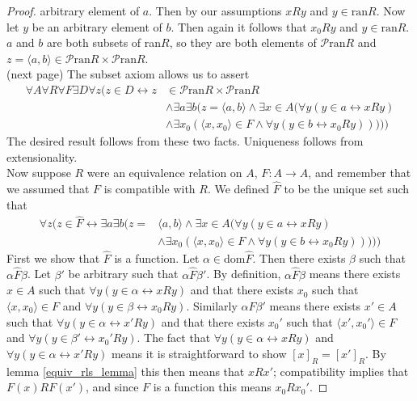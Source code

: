 \documentclass{report}
\begin{document}
\begin{proof}
arbitrary element of $a$. Then by our assumptions $xRy$ and $y\in\text{ran}R$. Now let $y$ be an arbitrary element of $b$. Then again it follows that $x_0Ry$ and
$y\in\text{ran}R$. $a$ and $b$ are both subsets of ran$R$, so they are both elements of $\mathscr P\text{ran}R$ and $z=\langle a,b\rangle\in\mathscr P\text{ran}R\times\mathscr P\text{ran}R$.\\
(next page)\newpage
The subset axiom allows us to assert
\begin{align*}
\forall A\forall R\forall F\exists D\forall z(z\in D\leftrightarrow z&\in\mathscr P\text{ran}R\times\mathscr P\text{ran}R\\
&\land\exists a\exists b(z=\langle a,b\rangle\land\exists x\in A(\forall y(y\in a\leftrightarrow xRy)\\
&\land\exists x_0(\langle x,x_0\rangle\in F\land\forall y(y\in b\leftrightarrow x_0Ry)))))
\end{align*}
The desired result follows from these two facts. Uniqueness follows from extensionality.\\
\indent Now suppose $R$ were an equivalence relation on $A$, $F:A\to A$, and remember that we assumed that $F$ is compatible with $R$. We defined $\hat F$ to be the unique set such that
\begin{align*}
\forall z(z\in\hat F\leftrightarrow\exists a\exists b(z=&\langle a,b\rangle\land\exists x\in A(\forall y(y\in a\leftrightarrow xRy)\\
&\land\exists x_0(\langle x,x_0\rangle\in F\land\forall y(y\in b\leftrightarrow x_0Ry)))))
\end{align*}
First we show that $\hat F$ is a function. Let $\alpha\in\text{dom}\hat F$. Then there exists $\beta$ such that $\alpha\hat F\beta$. Let $\beta'$ be arbitrary such that $\alpha\hat F\beta'$. 
By definition, $\alpha\hat F\beta$ means there exists $x\in A$ such that $\forall y(y\in\alpha\leftrightarrow xRy)$ and that there exists $x_0$ such that $\langle x,x_0\rangle\in F$ and
$\forall y(y\in\beta\leftrightarrow x_0Ry)$. Similarly $\alpha\hat F\beta'$ means 
there exists $x'\in A$ such that $\forall y(y\in\alpha\leftrightarrow x'Ry)$ and that there exists $x_0'$ such that $\langle x',x_0'\rangle\in F$ and $\forall y(y\in\beta'\leftrightarrow x_0'Ry)$. 
The fact that $\forall y(y\in\alpha\leftrightarrow xRy)$ and $\forall y(y\in\alpha\leftrightarrow x'Ry)$ means it is straightforward to show $[x]_R=[x']_R$. By lemma \ref{equiv_rls_lemma} this then 
means that $xRx'$; compatibility implies that $F(x)RF(x')$, and since $F$ is a function this means $x_0Rx_0'$.

\end{proof}
\end{document}
